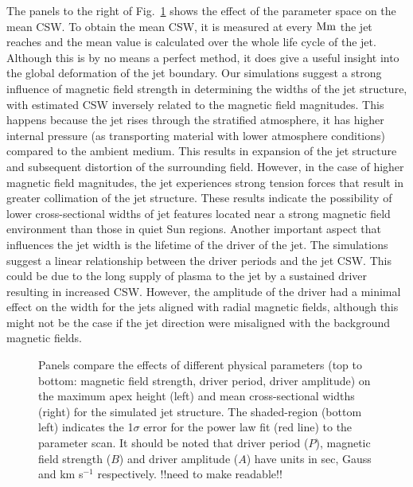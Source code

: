 %
The panels to the right of Fig.~\ref{parameter_scan_lines} shows the effect of the parameter space on the mean CSW. To obtain the mean CSW, it is measured at every $\rm{Mm}$ the jet reaches and the mean value is calculated over the whole life cycle of the jet. Although this is by no means a perfect method, it does give a useful insight into the global deformation of the jet boundary. Our simulations suggest a strong influence of magnetic field strength in determining the widths of the jet structure, with estimated CSW inversely related to the magnetic field magnitudes. This happens because the jet rises through the stratified atmosphere, it has higher internal pressure (as transporting material with lower atmosphere conditions) compared to the ambient medium. This results in expansion of the jet structure and subsequent distortion of the surrounding field. However, in the case of higher magnetic field magnitudes, the jet experiences strong tension forces that result in greater collimation of the jet structure. These results indicate the possibility of lower cross-sectional widths of jet features located near a strong magnetic field environment than those in quiet Sun regions. Another important aspect that influences the jet width is the lifetime of the driver of the jet. The simulations suggest a linear relationship between the driver periods and the jet CSW. This could be due to the long supply of plasma to the jet by a sustained driver resulting in increased CSW. However, the amplitude of the driver had a minimal effect on the width for the jets aligned with radial magnetic fields, although this might not be the case if the jet direction were misaligned with the background magnetic fields.
\begin{figure}
\captionsetup[subfigure]{labelformat=empty}
\centering
{}
\caption{Panels compare the effects of different physical parameters (top to bottom: magnetic field strength, driver period, driver amplitude) on the maximum apex height (left) and mean cross-sectional widths (right) for the simulated jet structure. The shaded-region (bottom left) indicates the 1$\sigma$ error for the power law fit (red line) to the parameter scan. It should be noted that driver period ($P$), magnetic field strength ($B$) and driver amplitude ($A$) have units in sec, Gauss and km s$^{-1}$ respectively. {\color{green}!!need to make readable!!}}
\label{parameter_scan_lines}
\end{figure}
